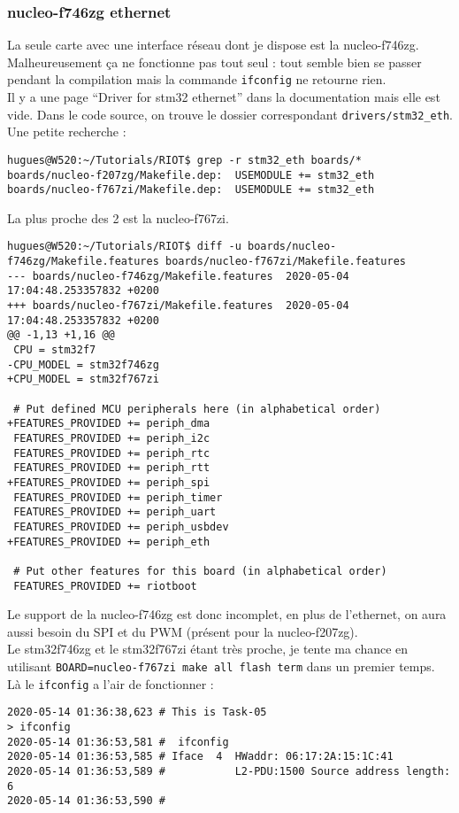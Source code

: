 \subsubsection{nucleo-f746zg ethernet}
La seule carte avec une interface réseau dont je dispose est la
nucleo-f746zg.\\

Malheureusement ça ne fonctionne pas tout seul : tout semble bien se
passer pendant la compilation mais la commande \texttt{ifconfig} ne
retourne rien.\\

Il y a une page \enquote{Driver for stm32 ethernet} dans la
documentation mais elle est vide. Dans le code source, on trouve le
dossier correspondant \texttt{drivers/stm32\_eth}.\\

Une petite recherche :
\begin{verbatim}
hugues@W520:~/Tutorials/RIOT$ grep -r stm32_eth boards/*
boards/nucleo-f207zg/Makefile.dep:  USEMODULE += stm32_eth
boards/nucleo-f767zi/Makefile.dep:  USEMODULE += stm32_eth
\end{verbatim}

La plus proche des 2 est la nucleo-f767zi.
{\scriptsize
\begin{verbatim}
hugues@W520:~/Tutorials/RIOT$ diff -u boards/nucleo-f746zg/Makefile.features boards/nucleo-f767zi/Makefile.features 
--- boards/nucleo-f746zg/Makefile.features	2020-05-04 17:04:48.253357832 +0200
+++ boards/nucleo-f767zi/Makefile.features	2020-05-04 17:04:48.253357832 +0200
@@ -1,13 +1,16 @@
 CPU = stm32f7
-CPU_MODEL = stm32f746zg
+CPU_MODEL = stm32f767zi
 
 # Put defined MCU peripherals here (in alphabetical order)
+FEATURES_PROVIDED += periph_dma
 FEATURES_PROVIDED += periph_i2c
 FEATURES_PROVIDED += periph_rtc
 FEATURES_PROVIDED += periph_rtt
+FEATURES_PROVIDED += periph_spi
 FEATURES_PROVIDED += periph_timer
 FEATURES_PROVIDED += periph_uart
 FEATURES_PROVIDED += periph_usbdev
+FEATURES_PROVIDED += periph_eth
 
 # Put other features for this board (in alphabetical order)
 FEATURES_PROVIDED += riotboot
\end{verbatim}
}
Le support de la nucleo-f746zg est donc incomplet, en plus de l'ethernet,
on aura aussi besoin du SPI et du PWM (présent pour la nucleo-f207zg).\\

Le stm32f746zg et le stm32f767zi étant très proche, je tente ma chance
en utilisant \texttt{BOARD=nucleo-f767zi make all flash term} dans un
premier temps. Là le \texttt{ifconfig} a l'air de fonctionner :
\begin{verbatim}
2020-05-14 01:36:38,623 # This is Task-05
> ifconfig
2020-05-14 01:36:53,581 #  ifconfig
2020-05-14 01:36:53,585 # Iface  4  HWaddr: 06:17:2A:15:1C:41 
2020-05-14 01:36:53,589 #           L2-PDU:1500 Source address length: 6
2020-05-14 01:36:53,590 #           
\end{verbatim}

